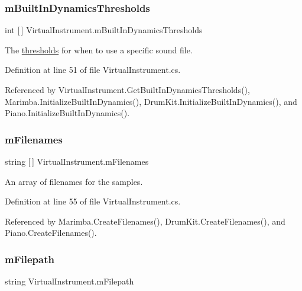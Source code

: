 \subsubsection{\texorpdfstring{m\+Built\+In\+Dynamics\+Thresholds}{mBuiltInDynamicsThresholds}}
{\footnotesize\ttfamily int \mbox{[}$\,$\mbox{]} Virtual\+Instrument.\+m\+Built\+In\+Dynamics\+Thresholds\hspace{0.3cm}{\ttfamily [protected]}}



The \hyperlink{group___audio_DefBIDThresh}{thresholds} for when to use a specific sound file. 



Definition at line 51 of file Virtual\+Instrument.\+cs.



Referenced by Virtual\+Instrument.\+Get\+Built\+In\+Dynamics\+Thresholds(), Marimba.\+Initialize\+Built\+In\+Dynamics(), Drum\+Kit.\+Initialize\+Built\+In\+Dynamics(), and Piano.\+Initialize\+Built\+In\+Dynamics().

\mbox{\label{group___v_i_base_pro_var_gab2add474ca506357688b5dd08cac4cb5}} 
\subsubsection{\texorpdfstring{m\+Filenames}{mFilenames}}
{\footnotesize\ttfamily string \mbox{[}$\,$\mbox{]} Virtual\+Instrument.\+m\+Filenames\hspace{0.3cm}{\ttfamily [protected]}}



An array of filenames for the samples. 



Definition at line 55 of file Virtual\+Instrument.\+cs.



Referenced by Marimba.\+Create\+Filenames(), Drum\+Kit.\+Create\+Filenames(), and Piano.\+Create\+Filenames().

\mbox{\label{group___v_i_base_pro_var_gac428224be859933d720a9c533fdb5643}} 
\subsubsection{\texorpdfstring{m\+Filepath}{mFilepath}}
{\footnotesize\ttfamily string Virtual\+Instrument.\+m\+Filepath\hspace{0.3cm}{\ttfamily [protected]}}



